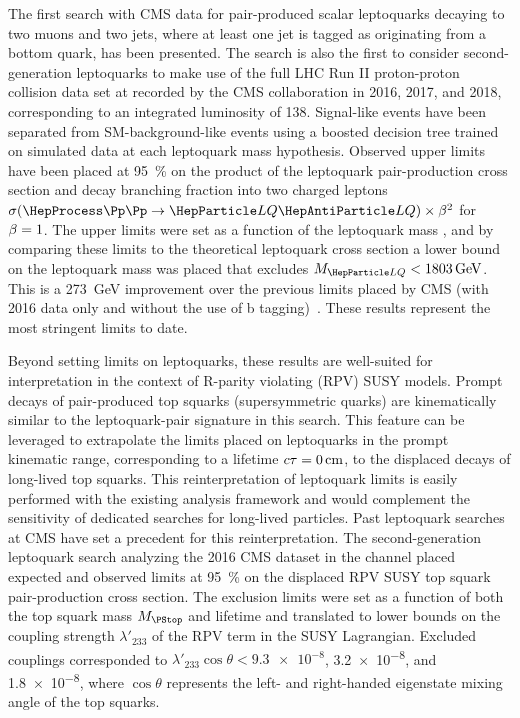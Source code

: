 

The first search with CMS data for pair-produced scalar leptoquarks decaying to two muons and two jets, where at least one jet is tagged as originating from a bottom quark, has been presented. The search is also the first to consider second-generation leptoquarks to make use of the full LHC Run II proton-proton collision data set at  recorded by the CMS collaboration in 2016, 2017, and 2018, corresponding to an integrated luminosity of \SI{138}{\invfb}. Signal-like events have been separated from SM-background-like events using a boosted decision tree trained on simulated data at each leptoquark mass hypothesis. Observed upper limits have been placed at \SI{95}{\%} \CL on the product of the leptoquark pair-production cross section and decay branching fraction into two charged leptons \linebreak $\xsec(\ppToLQLQ)\times\bfuu$ for $\beta = 1$. The upper limits were set as a function of the leptoquark mass \MLQ, and by comparing these limits to the theoretical leptoquark cross section  a lower bound on the leptoquark mass was placed that excludes $\MLQ < \SI{1803}{\GeV}$. This is a \SI{273}{\GeV} improvement over the previous limits placed by CMS (with 2016 data only and without the use of b tagging)~\cite{CMSLQ2_2016}. These results represent the most stringent limits to date.

Beyond setting limits on leptoquarks, these results are well-suited for interpretation in the context of R-parity violating (RPV) SUSY models. Prompt decays of pair-produced top squarks \PStop (supersymmetric quarks) are kinematically similar to the leptoquark-pair signature in this search. This feature can be leveraged to extrapolate the limits placed on leptoquarks in the prompt kinematic range, corresponding to a lifetime $\ct = \SI{0}{\cm}$, to the displaced decays of long-lived top squarks. This reinterpretation of leptoquark limits is easily performed with the existing analysis framework and would complement the sensitivity of dedicated searches for long-lived particles. Past leptoquark searches at CMS have set a precedent for this reinterpretation. The second-generation leptoquark search analyzing the 2016 CMS dataset in the \mumujj channel placed expected and observed limits at \SI{95}{\%} \CL on the displaced RPV SUSY top squark pair-production cross section. The exclusion limits were set as a function of both the top squark mass $M_{\PStop}$ and lifetime \ct and translated to lower bounds on the coupling strength $\lambda'_{233}$ of the RPV term in the SUSY Lagrangian. Excluded couplings corresponded to $\lambda'_{233}\cos\theta < \num{9.3e-8}$, \num{3.2e-8}, and 1.\num{8e-8}, where $\cos\theta$ represents the left- and right-handed eigenstate mixing angle of the top squarks.

